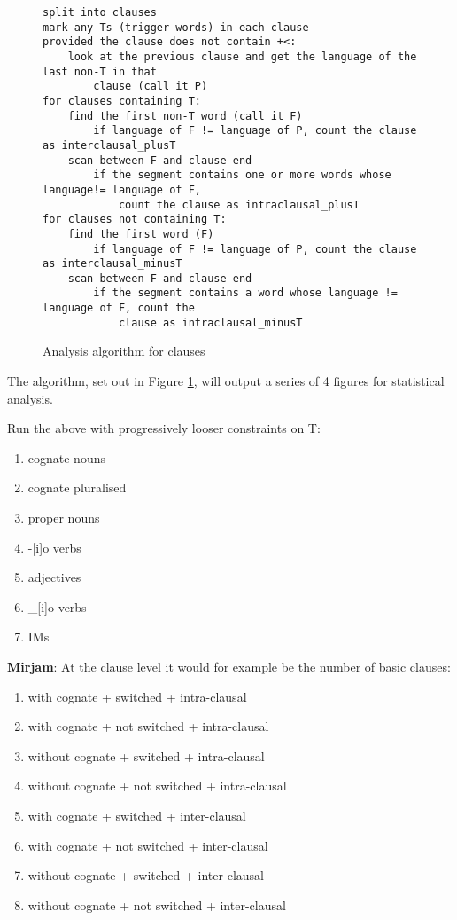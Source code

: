 \documentclass[a4paper,10pt]{article}
\begin{document}
\begin{figure}[h]
\begin{BVerbatim}[tabsize=4, fontsize=\relsize{-1}]
split into clauses
mark any Ts (trigger-words) in each clause
provided the clause does not contain +<:
    look at the previous clause and get the language of the last non-T in that 
        clause (call it P)
for clauses containing T:
    find the first non-T word (call it F)
        if language of F != language of P, count the clause as interclausal_plusT
    scan between F and clause-end
        if the segment contains one or more words whose language!= language of F, 
            count the clause as intraclausal_plusT
for clauses not containing T:
    find the first word (F)
        if language of F != language of P, count the clause as interclausal_minusT
    scan between F and clause-end
        if the segment contains a word whose language != language of F, count the 
            clause as intraclausal_minusT
\end{BVerbatim}
\caption{Analysis algorithm for clauses}
\label{clause_algorithm}
\end{figure}

The algorithm, set out in Figure \ref{clause_algorithm}, will output a series of 4 figures for statistical analysis.

Run the above with progressively looser constraints on T: 
\begin{enumerate}
\itemsep-0.4em 
\item cognate nouns
\item cognate pluralised
\item proper nouns
\item -[i]o verbs
\item adjectives
\item \_[i]o verbs
\item IMs   
\end{enumerate}

\textbf{Mirjam}: At the clause level it would for example be the number of basic clauses:
\begin{enumerate}
\itemsep-0.4em 
\item with cognate + switched + intra-clausal
\item with cognate + not switched + intra-clausal
\item without cognate + switched + intra-clausal
\item without cognate + not switched + intra-clausal
\item with cognate + switched + inter-clausal
\item with cognate + not switched + inter-clausal
\item without cognate + switched + inter-clausal
\item without cognate + not switched + inter-clausal
\end{enumerate}
\end{document}
